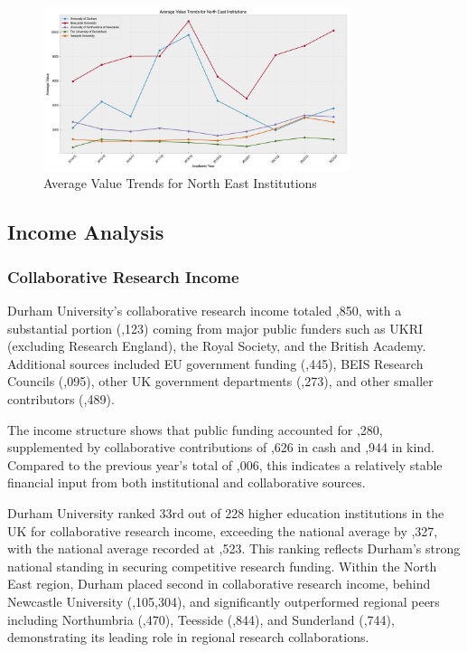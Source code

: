 \documentclass[journal,onecolumn, 10pt,draftclsnofoot]{IEEEtran}
\begin{document}
\begin{figure}[h]
\centering
\includegraphics[width=0.8\textwidth]{Fig/figure2.ne_institutions_trends.png}
\caption{Average Value Trends for North East Institutions}
\label{fig:institutions-trends}
\end{figure}

\subsection{Income Analysis}
\label{sec:income-analysis}

\subsubsection{Collaborative Research Income}

Durham University's collaborative research income totaled ,850, with a substantial portion (,123) coming from major public funders such as UKRI (excluding Research England), the Royal Society, and the British Academy. Additional sources included EU government funding (,445), BEIS Research Councils (,095), other UK government departments (,273), and other smaller contributors (,489).

The income structure shows that public funding accounted for ,280, supplemented by collaborative contributions of ,626 in cash and ,944 in kind. Compared to the previous year's total of ,006, this indicates a relatively stable financial input from both institutional and collaborative sources.

Durham University ranked 33rd out of 228 higher education institutions in the UK for collaborative research income, exceeding the national average by ,327, with the national average recorded at ,523. This ranking reflects Durham's strong national standing in securing competitive research funding. Within the North East region, Durham placed second in collaborative research income, behind Newcastle University (,105,304), and significantly outperformed regional peers including Northumbria (,470), Teesside (,844), and Sunderland (,744), demonstrating its leading role in regional research collaborations.
\end{document}
